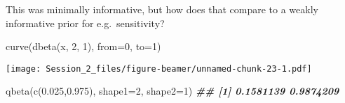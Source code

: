 \documentclass[
  ignorenonframetext,
  aspectratio=169,
]{beamer}
\newenvironment{Shaded}{\begin{snugshade}}{\end{snugshade}}
\newcommand{\AttributeTok}[1]{\textcolor[rgb]{0.77,0.63,0.00}{#1}}
\newcommand{\DecValTok}[1]{\textcolor[rgb]{0.00,0.00,0.81}{#1}}
\newcommand{\DocumentationTok}[1]{\textcolor[rgb]{0.56,0.35,0.01}{\textbf{\textit{#1}}}}
\newcommand{\FloatTok}[1]{\textcolor[rgb]{0.00,0.00,0.81}{#1}}
\newcommand{\FunctionTok}[1]{\textcolor[rgb]{0.00,0.00,0.00}{#1}}
\newcommand{\NormalTok}[1]{#1}
\begin{document}
\begin{frame}[fragile]
This was minimally informative, but how does that compare to a weakly
informative prior for e.g.~sensitivity?

\scriptsize

\begin{Shaded}
\begin{Highlighting}[]
\FunctionTok{curve}\NormalTok{(}\FunctionTok{dbeta}\NormalTok{(x, }\DecValTok{2}\NormalTok{, }\DecValTok{1}\NormalTok{), }\AttributeTok{from=}\DecValTok{0}\NormalTok{, }\AttributeTok{to=}\DecValTok{1}\NormalTok{)}
\end{Highlighting}
\end{Shaded}

\texttt{[image: Session\_2\_files/figure-beamer/unnamed-chunk-23-1.pdf]}

\begin{Shaded}
\begin{Highlighting}[]
\FunctionTok{qbeta}\NormalTok{(}\FunctionTok{c}\NormalTok{(}\FloatTok{0.025}\NormalTok{,}\FloatTok{0.975}\NormalTok{), }\AttributeTok{shape1=}\DecValTok{2}\NormalTok{, }\AttributeTok{shape2=}\DecValTok{1}\NormalTok{)}
\DocumentationTok{\#\# [1] 0.1581139 0.9874209}
\end{Highlighting}
\end{Shaded}

\normalsize
\end{frame}
\end{document}
